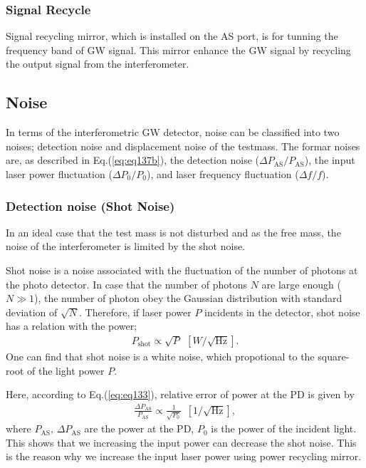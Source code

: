 \subsubsection{Signal Recycle}
Signal recycling mirror, which is installed on the AS port, is for tunning the frequency band of GW signal. This mirror enhance the GW signal by recycling the output signal from the interferometer.

\subsection{Noise}
In terms of the interferometric GW detector, noise can be classified into two noises; detection noise and displacement noise of the testmass. The formar noises are, as described in Eq.(\ref{eq:eq137b}), the detection noise  ($\Delta{P_{\mathrm{AS}}}/P_{\mathrm{AS}}$), the input laser power fluctuation  ($\Delta{P_0}/P_0$), and laser frequency fluctuation ($\Delta{f}/f$).

\subsubsection{Detection noise (Shot Noise)}
In an ideal case that the test mass is not disturbed and as the free mass, the noise of the interferometer is limited by the shot noise.

Shot noise is a noise associated with the fluctuation of the number of photons at the photo detector. In case that the number of photons $N$ are large enough ($N\gg1$), the number of photon obey the Gaussian distribution with standard deviation of $\sqrt{N}$. Therefore, if laser power $P$ incidents in the detector, shot noise has a relation with the power;
\begin{eqnarray}
  P_{\mathrm{shot}} \propto \sqrt{P}\ \ [W/\sqrt{\mathrm{Hz}}].  \label{eq:eq136}
\end{eqnarray}
One can find that shot noise is a white noise, which propotional to the square-root of the light power $P$.

Here, according to Eq.(\ref{eq:eq133}), relative error of power at the PD is given by 
\begin{eqnarray}
  \frac{\Delta P_{\mathrm{AS}}}{P_{\mathrm{AS}}}  \propto \frac{1}{\sqrt{P_{\mathrm{0}}}}\ \ [1/\sqrt{\mathrm{Hz}}],  \label{eq:eq136}
\end{eqnarray}
where $P_{\mathrm{AS}},\,\Delta P_{\mathrm{AS}}$ are the power at the PD, $P_0$ is the power of the incident light. This shows that we increasing the input power can decrease the shot noise. This is the reason why we increase the input laser power using power recycling mirror.


